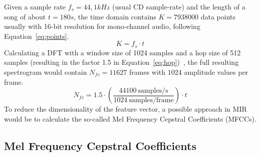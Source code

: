 Given a sample rate $f_s = 44,1kHz$ (usual CD sample-rate) and the length of a song of about $t = 180s$, the time domain contains $K = 7938000$ data points usually with 16-bit resolution for mono-channel audio, following Equation~\eqref{eq:points}. 
\begin{equation} \label{eq:points}
K = f_s \cdot t
\end{equation}
Calculating a DFT with a window size of 1024 samples and a hop size of 512 samples (resulting in the factor 1.5 in Equation~\eqref{eq:hop})~\cite[p. 41]{knees1}, the full resulting spectrogram would contain $N_{fv} = 11627$ frames with 1024 amplitude values per frame.
\begin{equation} \label{eq:hop}
N_{fv} = 1.5 \cdot (\frac{44100 \ \text{samples/s}}{1024 \ \text{samples/frame}}) \cdot t
\end{equation}
To reduce the dimensionality of the feature vector, a possible approach in MIR would be to calculate the so-called Mel Frequency Cepstral Coefficients (MFCCs).

\subsection{Mel Frequency Cepstral Coefficients}\label{mfccsim}

